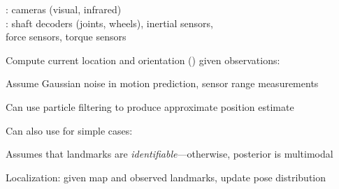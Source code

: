 \documentclass{article}
\begin{document}
\begin{huge}
\centerline{\qquad{}}

: cameras (visual, infrared)\\
: shaft decoders (joints, wheels), inertial sensors,\\
force sensors, torque sensors



Compute current location and orientation () given observations:

\vspace*{0.2in}

\textwidth
{}


\vspace*{0.2in}


Assume Gaussian noise in motion prediction, sensor range measurements


Can use particle filtering to produce approximate position estimate

\vspace*{0.2in}



Can also use  for simple cases:

\vspace*{0.2in}

\textwidth
{}

Assumes that landmarks are {\em identifiable}---otherwise,
posterior is multimodal






Localization: given map and observed landmarks, update pose distribution


\end{huge}
\end{document}
